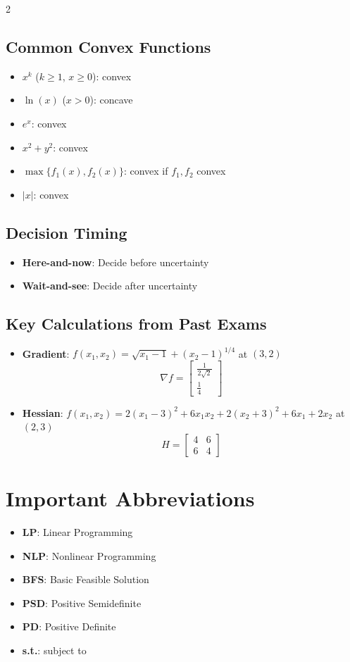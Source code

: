 \documentclass[10pt,a4paper,landscape]{article}
\begin{document}
\begin{multicols}{2}
\subsection*{Common Convex Functions}
\begin{itemize}
\item $x^k$ ($k \geq 1$, $x \geq 0$): convex
\item $\ln(x)$ ($x > 0$): concave
\item $e^x$: convex
\item $x^2 + y^2$: convex
\item $\max\{f_1(x), f_2(x)\}$: convex if $f_1, f_2$ convex
\item $|x|$: convex
\end{itemize}

\subsection*{Decision Timing}
\begin{itemize}
\item \textbf{Here-and-now}: Decide before uncertainty
\item \textbf{Wait-and-see}: Decide after uncertainty
\end{itemize}

\subsection*{Key Calculations from Past Exams}
\begin{itemize}
\item \textbf{Gradient}: $f(x_1,x_2) = \sqrt{x_1-1} + (x_2-1)^{1/4}$ at $(3,2)$
  \[\nabla f = \begin{bmatrix} \frac{1}{2\sqrt{2}} \\ \frac{1}{4} \end{bmatrix}\]
\item \textbf{Hessian}: $f(x_1,x_2) = 2(x_1-3)^2 + 6x_1x_2 + 2(x_2+3)^2 + 6x_1 + 2x_2$ at $(2,3)$
  \[H = \begin{bmatrix} 4 & 6 \\ 6 & 4 \end{bmatrix}\]
\end{itemize}

\end{multicols}

\vfill

\section*{Important Abbreviations}
\begin{itemize}
\item \textbf{LP}: Linear Programming
\item \textbf{NLP}: Nonlinear Programming  
\item \textbf{BFS}: Basic Feasible Solution
\item \textbf{PSD}: Positive Semidefinite
\item \textbf{PD}: Positive Definite
\item \textbf{s.t.}: subject to
\end{itemize}
\end{document}
